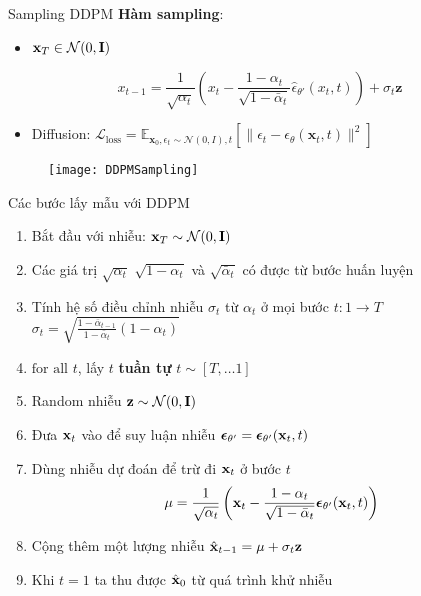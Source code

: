 \begin{frame}{Sampling DDPM}
	\textbf{Hàm sampling}:
	\begin{itemize}
		\item $\mathbf{x}_T \in \mathcal{N}(0, \mathbf{I})$
	\end{itemize}
	
	\begin{equation*}
		x_{t-1} = \frac{1}{\sqrt{\alpha_t}} \left( x_t - \frac{1 - \alpha_t}{\sqrt{1 - \bar{\alpha}_t}} \hat{\epsilon}_{\theta'}(x_t, t) \right) + \sigma_t \mathbf{z}
	\end{equation*}
	
	\begin{itemize}
		\item Diffusion: $\mathcal{L}_{\text{loss}}= \mathbb{E}_{\mathbf{x}_{0}, \epsilon_t \sim \mathcal{N}(0, I), t} \left[ \| \epsilon_t - \epsilon_\theta(\mathbf{x}_t, t) \|^2 \right]$
	\end{itemize}
	\begin{figure}
		\centering
		\texttt{[image: DDPMSampling]}
	\end{figure}
\end{frame}

\begin{frame}{Các bước lấy mẫu với DDPM}
	
	\begin{enumerate}
		\item Bắt đầu với nhiễu: $\mathbf{x}_T \sim \mathcal{N}(0, \mathbf{I})$
		\item Các giá trị $\sqrt{\alpha_t}$ $\sqrt{1 - \alpha_t}$ và $\sqrt{\bar{\alpha}_t}$ có được từ bước huấn luyện
		\item Tính hệ số điều chỉnh nhiễu $\sigma_t$ từ $\alpha_t$ ở mọi bước $t: 1 \rightarrow T$
		$\sigma_t = \sqrt{\frac{1 - \bar{\alpha}_{t-1}}{1 - \bar{\alpha}_t} (1 - \alpha_t)}$
		
		\item $\text{for all}$ $t$, lấy $t$ \textbf{tuần tự} $t \sim [T, \dots 1]$
		\item Random nhiễu $\mathbf{z} \sim \mathcal{N}(0, \mathbf{I})$
		\item Đưa $\mathbf{x}_t$ vào để suy luận nhiễu ${\boldsymbol{\epsilon}}_{\theta'} = {\boldsymbol{\epsilon}}_{\theta'}(\mathbf{x}_t, t)$
		\item Dùng nhiễu dự đoán để trừ đi $\mathbf{x}_t$ ở bước $t$
			$$\mu =  \frac{1}{\sqrt{\alpha_t}}\left( \mathbf{x}_t - \frac{1-\alpha_t}{\sqrt{1-\bar\alpha_t}} {\boldsymbol{\epsilon}}_{\theta'}(\mathbf{x}_t, t) \right)$$
		\item Cộng thêm một lượng nhiễu $\hat{\mathbf{x}}_{t-1} = \mu + \sigma_t \mathbf{z}$
		\item Khi $t=1$ ta thu được $\hat{\mathbf{x}}_0$ từ quá trình khử nhiễu
	\end{enumerate}
\end{frame}